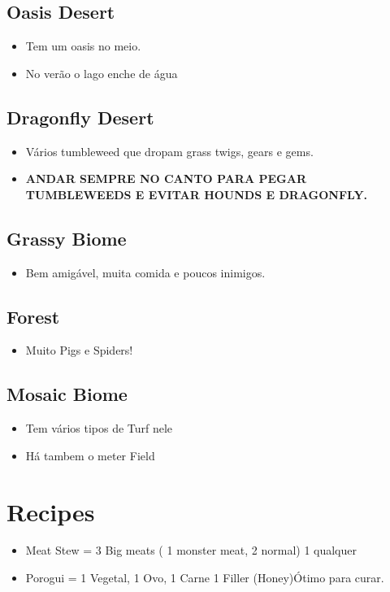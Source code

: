 \documentclass{article}
\begin{document}
\subsection*{Oasis Desert}
\begin{itemize}
    \item Tem um oasis no meio.
    \item No verão o lago enche de água
\end{itemize}


\subsection*{Dragonfly Desert}
\begin{itemize}
\item Vários tumbleweed que dropam grass twigs, gears e gems.\\
\item \textbf{ANDAR SEMPRE NO CANTO PARA PEGAR TUMBLEWEEDS E EVITAR HOUNDS E DRAGONFLY.}
\end{itemize}


\subsection*{Grassy Biome}
\begin{itemize}
    \item Bem amigável, muita comida e poucos inimigos.
\end{itemize}


\subsection*{Forest}
\begin{itemize}
    \item Muito Pigs e Spiders!
\end{itemize}


\subsection*{Mosaic Biome}
\begin{itemize}
    \item Tem vários tipos de Turf nele 
    \item Há tambem o meter Field
\end{itemize}


\section{Recipes}
\begin{itemize}
    \item Meat Stew = 3 Big meats ( 1 monster meat, 2 normal) 1 qualquer
    \item Porogui = 1 Vegetal, 1 Ovo, 1 Carne 1 Filler (Honey)Ótimo para curar.
\end{itemize}
\end{document}
